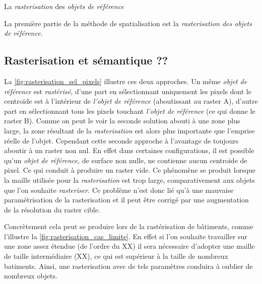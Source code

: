 La \emph{rasterisation} des \emph{objets de référence}

La première partie de la méthode de spatialisation est la
\emph{rasterisation des objets de référence.}



\subsection{Rasterisation et sémantique ??}



La \autoref{fig:rasterisation_sel_pixels} illustre ces deux approches. Un même \emph{objet de référence} est \emph{rastérisé,} d'une part en sélectionnant uniquement les pixels dont le centroïde est à l'intérieur de \emph{l'objet de référence} (aboutissant au raster \textcolor{RdBu-9-1}{\textsf{A}}), d'autre part en sélectionnant tous les pixels touchant \emph{l'objet de référence} (ce qui donne le raster \textcolor{RdBu-9-9}{\textsf{B}}). Comme on peut le voir la seconde solution abouti à une zone plus large, la zone résultant de la \emph{rasterisation} est alors plus importante que l'emprise réelle de l'objet. Cependant cette seconde approche à l'avantage de toujours aboutir à un raster non nul. En effet dans certaines configurations, il est possible qu'un \emph{objet de référence,} de surface non nulle, ne contienne aucun centroïde de pixel. Ce qui conduit à produire un raster vide. Ce phénomène se produit lorsque la maille utilisée pour la \emph{rasterisation} est trop large, comparativement aux objets que l'on souhaite \emph{rasteriser.} Ce problème n'est donc lié qu'à une mauvaise paramétrisation de la rasterisation et il peut être corrigé par une augmentation de la résolution du raster cible.

Concrètement cela peut se produire lors de la rastérisation de bâtiments, comme l'illustre la \autoref{fig:rasterisation_cas_limite}. En effet si l'on souhaite travailler sur une zone assez étendue (de l'ordre du XX) il sera nécessaire d'adopter une maille de taille intermédiaire (XX), ce qui est supérieur à la taille de nombreux batiments. Ainsi, une rasterisation avec de tels paramètres conduira à oublier de nombreux objets.

